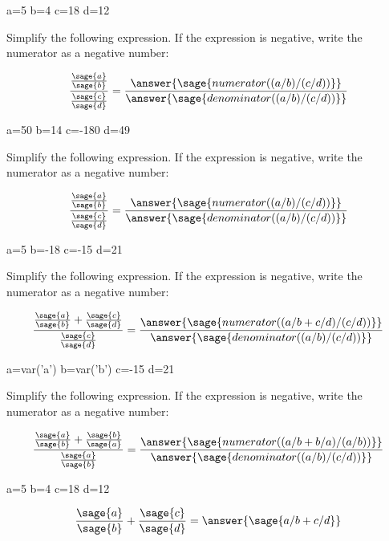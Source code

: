 \documentclass{ximera}
\begin{document}
\begin{problem}
\begin{sagesilent}
a=5
b=4
c=18
d=12
\end{sagesilent}
Simplify the following expression. If the expression is negative, write the numerator as a negative number:
\begin{prompt}
$$\frac{\frac{\sage{a}}{\sage{b}}}{\frac{\sage{c}}{\sage{d}}}=\frac{\answer{\sage{numerator((a/b)/(c/d))}}}{\answer{\sage{denominator((a/b)/(c/d))}}}$$
\end{prompt}
\end{problem}


\begin{problem}
\begin{sagesilent}
a=50
b=14
c=-180
d=49
\end{sagesilent}
Simplify the following expression.  If the expression is negative, write the numerator as a negative number:
\begin{prompt}
$$\frac{\frac{\sage{a}}{\sage{b}}}{\frac{\sage{c}}{\sage{d}}}=\frac{\answer{\sage{numerator((a/b)/(c/d))}}}{\answer{\sage{denominator((a/b)/(c/d))}}}$$
\end{prompt}
\end{problem}


\begin{problem}
\begin{sagesilent}
a=5
b=-18
c=-15
d=21
\end{sagesilent}
Simplify the following expression.  If the expression is negative, write the numerator as a negative number:
\begin{prompt}
$$\frac{\frac{\sage{a}}{\sage{b}}+\frac{\sage{c}}{\sage{d}}}{\frac{\sage{c}}{\sage{d}}}=\frac{\answer{\sage{numerator((a/b+c/d)/(c/d))}}}{\answer{\sage{denominator((a/b)/(c/d))}}}$$
\end{prompt}
\end{problem}


\begin{problem}
\begin{sagesilent}
a=var('a')
b=var('b')
c=-15
d=21
\end{sagesilent}
Simplify the following expression.  If the expression is negative, write the numerator as a negative number:
\begin{prompt}
$$\frac{\frac{\sage{a}}{\sage{b}}+\frac{\sage{b}}{\sage{a}}}{\frac{\sage{a}}{\sage{b}}}=\frac{\answer{\sage{numerator((a/b+b/a)/(a/b))}}}{\answer{\sage{denominator((a/b)/(c/d))}}}$$
\end{prompt}
\end{problem}

\begin{problem}
\begin{sagesilent}
a=5
b=4
c=18
d=12
\end{sagesilent}
\begin{prompt}
$$\frac{\sage{a}}{\sage{b}}+\frac{\sage{c}}{\sage{d}}=\answer{\sage{a/b+c/d}}$$
\end{prompt}
\end{problem}
\end{document}
